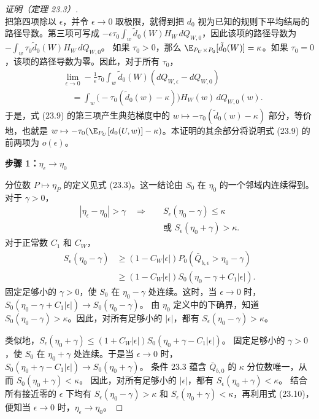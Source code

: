 \begin{proof}[证明（定理 23.3）]
\begin{equation}
\tag{23.9}
\end{equation}
把第四项除以 $\epsilon$，并令 $\epsilon\to0$ 取极限，就得到把 $d_0$ 视为已知的规则下平均结局的路径导数。第三项可写成
$-\epsilon\tau_0\int_w\tilde d_0(W)H_W\,dQ_{W,0}$，因此该项的路径导数为
$-\int_w\tau_0\tilde d_0(W)H_W\,dQ_{W,0}$。
如果 $\tau_0>0$，那么 $\E_{P_U\times P_0}[\tilde d_0(W)]=\kappa$。如果 $\tau_0=0$，该项的路径导数为零。因此，对于所有 $\tau_0$，
\[
\begin{aligned}
 &\lim_{\epsilon\to0}-\frac1\epsilon\tau_0\int_w\tilde d_0(W)(dQ_{W,\epsilon}-dQ_{W,0})\\
 &\quad=\int_w\bigl(-\tau_0(\tilde d_0(w)-\kappa)\bigr)H_W(w)\,dQ_{W,0}(w).
\end{aligned}
\]
于是，式 (23.9) 的第三项产生典范梯度中的 $w\mapsto-\tau_0(\tilde d_0(w)-\kappa)$ 部分，等价地，也就是 $w\mapsto-\tau_0(\E_{P_U}[d_0(U,w)]-\kappa)$。本证明的其余部分将说明式 (23.9) 的前两项为 $o(\epsilon)$。

\medskip\noindent\textbf{步骤 1：$\eta_\epsilon\to\eta_0$}

分位数 $P\mapsto\eta_P$ 的定义见式 (23.3)。这一结论由 $S_0$ 在 $\eta_0$ 的一个邻域内连续得到。对于 $\gamma>0$，
\begin{equation}
\begin{aligned}
 |\eta_\epsilon-\eta_0|>\gamma
 \quad\Longrightarrow\quad&S_\epsilon(\eta_0-\gamma)\leq\kappa\\
 &\text{或 }S_\epsilon(\eta_0+\gamma)>\kappa.
\end{aligned}
\tag{23.10}
\end{equation}
对于正常数 $C_1$ 和 $C_W$，
\[
\begin{aligned}
 S_\epsilon(\eta_0-\gamma)
 &\geq(1-C_W|\epsilon|)P_0(\bar Q_{b,\epsilon}>\eta_0-\gamma)\\
 &\geq(1-C_W|\epsilon|)S_0(\eta_0-\gamma+C_1|\epsilon|).
\end{aligned}
\]
固定足够小的 $\gamma>0$，使 $S_0$ 在 $\eta_0-\gamma$ 处连续。这时，当 $\epsilon\to0$ 时，
$S_0(\eta_0-\gamma+C_1|\epsilon|)\to S_0(\eta_0-\gamma)$。
由 $\eta_0$ 定义中的下确界，知道 $S_0(\eta_0-\gamma)>\kappa$。因此，对所有足够小的 $|\epsilon|$，都有 $S_\epsilon(\eta_0-\gamma)>\kappa$。

类似地，$S_\epsilon(\eta_0+\gamma)\leq(1+C_W|\epsilon|)S_0(\eta_0+\gamma-C_1|\epsilon|)$。
固定足够小的 $\gamma>0$，使 $S_0$ 在 $\eta_0+\gamma$ 处连续。于是当 $\epsilon\to0$ 时，
$S_0(\eta_0+\gamma-C_1|\epsilon|)\to S_0(\eta_0+\gamma)$。
条件 23.3 蕴含 $\bar Q_{b,0}$ 的 $\kappa$ 分位数唯一，从而 $S_0(\eta_0+\gamma)<\kappa$。
因此，对所有足够小的 $|\epsilon|$，都有 $S_\epsilon(\eta_0+\gamma)<\kappa$。
结合所有接近零的 $\epsilon$ 下均有 $S_\epsilon(\eta_0-\gamma)>\kappa$ 和
$S_\epsilon(\eta_0+\gamma)<\kappa$，再利用式 (23.10)，便知当 $\epsilon\to0$ 时，$\eta_\epsilon\to\eta_0$。


\end{proof}
